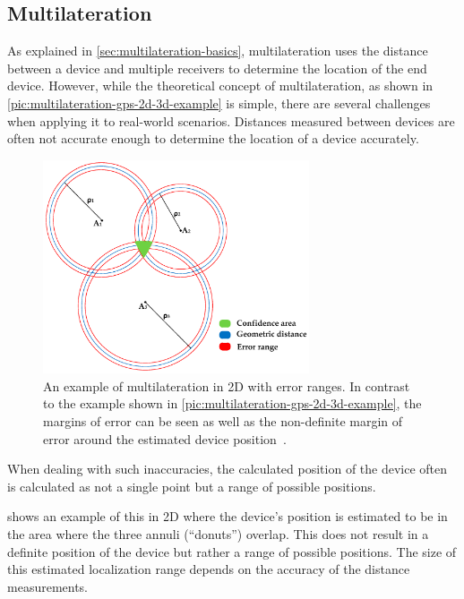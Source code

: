 \subsection{Multilateration}\label{sec:lorawan-multilateration}

As explained in \cref{sec:multilateration-basics}, multilateration uses the distance between a device and multiple receivers to determine the location of the end device.
However, while the theoretical concept of multilateration, as shown in \cref{pic:multilateration-gps-2d-3d-example} is simple, there are several challenges when applying it to real-world scenarios.
Distances measured between devices are often not accurate enough to determine the location of a device accurately.

\begin{figure}[htbp]
    \centering
    \includegraphics[width=0.7\textwidth]{pictures/multilateration/multilateration_error_ranges.png}
    \caption{
        An example of multilateration in 2D with error ranges.
        In contrast to the example shown in \cref{pic:multilateration-gps-2d-3d-example}, the margins of error can be seen as well as the non-definite margin of error around the estimated device position~\protect\cite{kapoor_novel_2016}.
    }\label{pic:multilateration-with-error-ranges-example}
\end{figure}

When dealing with such inaccuracies, the calculated position of the device often is calculated as not a single point but a range of possible positions.

 shows an example of this in 2D where the device's position is estimated to be in the area where the three annuli (``donuts'') overlap.
This does not result in a definite position of the device but rather a range of possible positions.
The size of this estimated localization range depends on the accuracy of the distance measurements.

